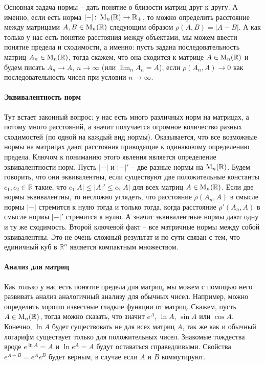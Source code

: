 Основная задача нормы -- дать понятие о близости матриц друг к другу.
А именно, если есть норма $|{-}|\colon \operatorname{M}_{n}(\mathbb R)\to \mathbb R_+$, то можно определить расстояние между матрицами $A, B\in\operatorname{M}_{n}(\mathbb R)$ следующим образом $\rho(A, B) = |A - B|$.
А как только у нас есть понятие расстояния между объектами, мы можем ввести понятие предела и сходимости, а именно: пусть задана последовательность матриц $A_n\in\operatorname{M}_{n}(\mathbb R)$, тогда скажем, что она сходится к матрице $A\in\operatorname{M}_{n}(\mathbb R)$ и будем писать $A_n\to A$, $n\to \infty$ (или $\lim_n A_n = A$), если $\rho(A_n, A)\to 0$ как последовательность чисел при условии $n\to \infty$.

\paragraph{Эквивалентность норм}

Тут встает законный вопрос: у нас есть много различных норм на матрицах, а потому много расстояний, а значит получается огромное количество разных сходимостей (по одной на каждый вид нормы).
Оказывается, что все возможные нормы на матрицах дают расстояния приводящие к одинаковому определению предела.
Ключом к пониманию этого явления является определение эквивалентности норм.
Пусть $|{-}|$ и $|{-}|'$ -- две разные нормы на $\operatorname{M}_{n}(\mathbb R)$.
Будем говорить, что они эквивалентны, если существуют две положительные константы $c_1, c_2\in\mathbb R$ такие, что $c_1 |A|\leqslant |A|'\leqslant c_2|A|$ для всех матриц $A\in \operatorname{M}_{n}(\mathbb R)$.
Если две нормы эквивалентны, то несложно углядеть, что расстояние $\rho(A_n,A)$ в смысле нормы $|{-}|$ стремится к нулю  тогда и только тогда, когда расстояние $\rho'(A_n,A)$ в смысле нормы $|{-}|'$ стремится к нулю.
А значит эквивалентные нормы дают одну и ту же сходимость.
Второй ключевой факт -- все матричные нормы между собой эквивалентны.
Это не очень сложный результат и по сути связан с тем, что единичный куб в $\mathbb R^n$ является компактным множеством.

\paragraph{Анализ для матриц}

Как только у нас есть понятие предела для матриц, мы можем с помощью него развивать анализ аналогичный анализу для обычных чисел.
Например, можно определить хорошо известные гладкие функции от матриц.
Скажем, пусть $A\in\operatorname{M}_{n}(\mathbb R)$, тогда можно сказать, что значит $e^A$, $\ln A$, $\sin A$ или $\cos A$.
Конечно, $\ln A$ будет существовать не для всех матриц $A$, так же как и обычный логарифм существует только для положительных чисел.
Знакомые тождества вроде $e^{\ln A} = A$ и $\ln e^A = A$ будут оставаться справедливыми.
Свойства $e^{A+B}= e^A e^B$ будет верным, в случае если $A$ и $B$ коммутируют.

